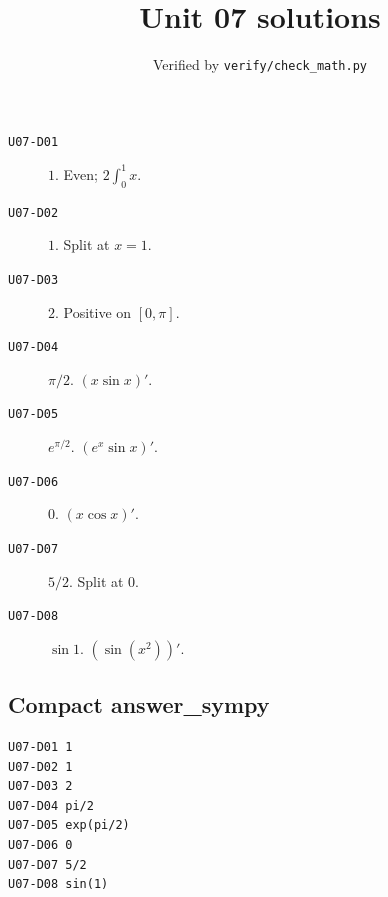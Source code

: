 
\title{Unit 07 solutions}
\author{Verified by \texttt{verify/check\_math.py}}

\maketitle
\begin{description}
\item[\texttt{U07-D01}] \(1\). Even; $2\int_0^1 x$.
\item[\texttt{U07-D02}] \(1\). Split at $x=1$.
\item[\texttt{U07-D03}] \(2\). Positive on $[0,\pi]$.
\item[\texttt{U07-D04}] \(\pi/2\). $(x\sin x)'$.
\item[\texttt{U07-D05}] \(e^{\pi/2}\). $(e^x\sin x)'$.
\item[\texttt{U07-D06}] \(0\). $(x\cos x)'$.
\item[\texttt{U07-D07}] \(5/2\). Split at 0.
\item[\texttt{U07-D08}] \(\sin 1\). $(\sin(x^2))'$.
\end{description}
\subsection*{Compact answer\_sympy}
\begin{verbatim}
U07-D01 1
U07-D02 1
U07-D03 2
U07-D04 pi/2
U07-D05 exp(pi/2)
U07-D06 0
U07-D07 5/2
U07-D08 sin(1)
\end{verbatim}


